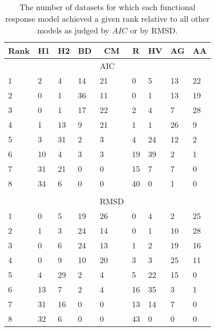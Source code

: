 \begin{table}[!tbp]
\caption{The number of datasets for which each functional response model achieved a given rank relative to all other models as judged by $AIC$ or by RMSD.\label{table:AIC_and_RMSD_rankings}} 
\begin{center}
\begin{tabular}{lllllllll}
\hline\hline
\multicolumn{1}{l}{Rank}&\multicolumn{1}{c}{H1}&\multicolumn{1}{c}{H2}&\multicolumn{1}{c}{BD}&\multicolumn{1}{c}{CM}&\multicolumn{1}{c}{R}&\multicolumn{1}{c}{HV}&\multicolumn{1}{c}{AG}&\multicolumn{1}{c}{AA}\tabularnewline
\hline
&&&&AIC&&&&\tabularnewline
1&2&4&14&21&0&5&13&22\tabularnewline
2&0&1&36&11&0&1&13&19\tabularnewline
3&0&1&17&22&2&4&7&28\tabularnewline
4&1&13&9&21&1&1&26&9\tabularnewline
5&3&31&2&3&4&24&12&2\tabularnewline
6&10&4&3&3&19&39&2&1\tabularnewline
7&31&21&0&0&15&7&7&0\tabularnewline
8&34&6&0&0&40&0&1&0\tabularnewline
&&&&&&&&\tabularnewline
&&&&RMSD&&&&\tabularnewline
1&0&5&19&26&0&4&2&25\tabularnewline
2&1&3&24&14&0&1&10&28\tabularnewline
3&0&6&24&13&1&2&19&16\tabularnewline
4&0&9&10&20&3&3&25&11\tabularnewline
5&4&29&2&4&5&22&15&0\tabularnewline
6&13&7&2&4&16&35&3&1\tabularnewline
7&31&16&0&0&13&14&7&0\tabularnewline
8&32&6&0&0&43&0&0&0\tabularnewline
\hline
\end{tabular}\end{center}
\end{table}
